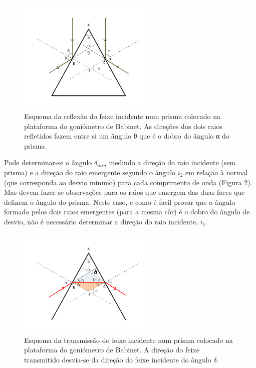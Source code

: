 \documentclass[a4paper,12pt]{article}  %
\begin{document}
\begin{figure}[tb]  \centering 
	\includegraphics[width=0.6\textwidth]{angulo}
	\caption{Esquema da reflexão do feixe incidente num prisma colocado na plataforma do goniómetro de Babinet. As direções dos dois raios refletidos fazem entre si um ângulo θ que é o dobro do ângulo α do prisma. \label{fig:angulo}} 
\end{figure}

Pode determinar-se o ângulo $\delta_{min}$ medindo a direção do raio incidente (sem prisma) e a direção do raio emergente segundo o ângulo $i_2$ em relação à normal (que corresponda ao desvio mínimo) para cada comprimento de onda (Figura \ref{fig:desvio}). Mas devem fazer-se observações para os raios que emergem das duas faces que definem o ângulo do prisma. Neste caso, e como é facil provar que o ângulo formado pelos dois raios emergentes (para a mesma côr) é o dobro do ângulo de desvio, não é necessário determinar a direção do raio incidente, $i_1$.


\begin{figure}[tb]  \centering 
	\includegraphics[width=0.6\textwidth]{desvio}
	\caption{Esquema da transmissão do feixe incidente num prisma colocado na plataforma do goniómetro de Babinet. A direção do feixe transmitido desvia-se da direção do feixe incidente do ângulo $\delta$. \label{fig:desvio}} 
\end{figure}
\end{document}
